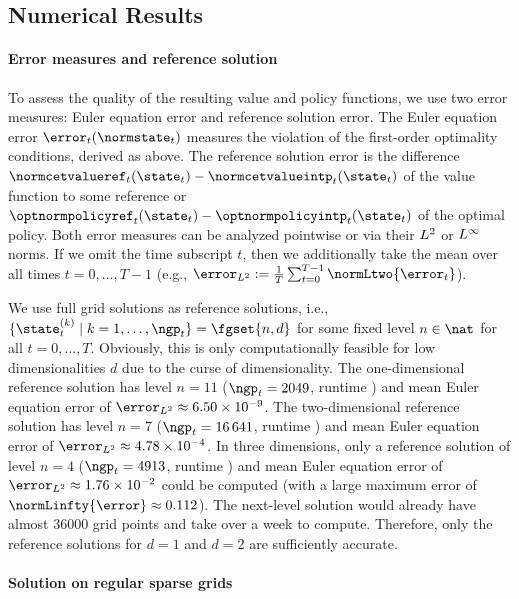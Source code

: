 \subsection{Numerical Results}

\paragraph{Error measures and reference solution}

To assess the quality of the resulting value and policy functions,
we use two error measures:
Euler equation error and reference solution error.
The Euler equation error $\error_t(\normstate_t)$
measures the violation of the first-order optimality conditions,
derived as above.
The reference solution error is the difference
$\normcetvalueref_t(\state_t) - \normcetvalueintp_t(\state_t)$
of the value function to some reference or
$\optnormpolicyref_t(\state_t) - \optnormpolicyintp_t(\state_t)$
of the optimal policy.
Both error measures can be analyzed pointwise or
via their $L^2$ or $L^\infty$ norms.
If we omit the time subscript $t$,
then we additionally take the mean over all times $t = 0, \dotsc, T - 1$
(e.g., $
  \error_{\Ltwo} := \frac{1}{T} \sum_{t=0}^{T-1} \normLtwo{\error_t}
$).

We use full grid solutions as reference solutions,
i.e., $\{\state_t^{(k)} \mid k = 1, \dotsc, \ngp_t\} = \fgset{n,d}$
for some fixed level $n \in \nat$ for all $t = 0, \dotsc, T$.
Obviously, this is only computationally feasible
for low dimensionalities $d$ due to the curse of dimensionality.
The one-dimensional reference solution has level $n = 11$
($\ngp_t = \num{2049}$, runtime ) and
mean Euler equation error of
$\error_{\Ltwo} \approx \num{6.50e-9}$.
The two-dimensional reference solution has level $n = 7$
($\ngp_t = \num{16641}$, runtime ) and
mean Euler equation error of
$\error_{\Ltwo} \approx \num{4.78e-4}$.
In three dimensions, only a reference solution of level $n = 4$
($\ngp_t = \num{4913}$, runtime ) and
mean Euler equation error of
$\error_{\Ltwo} \approx \num{1.76e-2}$ could be computed
(with a large maximum error of $\normLinfty{\error} \approx \num{0.112}$).
The next-level solution would already have almost \num{36000} grid points
and take over a week to compute.
Therefore, only the reference solutions for $d = 1$ and $d = 2$
are sufficiently accurate.

\paragraph{Solution on regular sparse grids}

